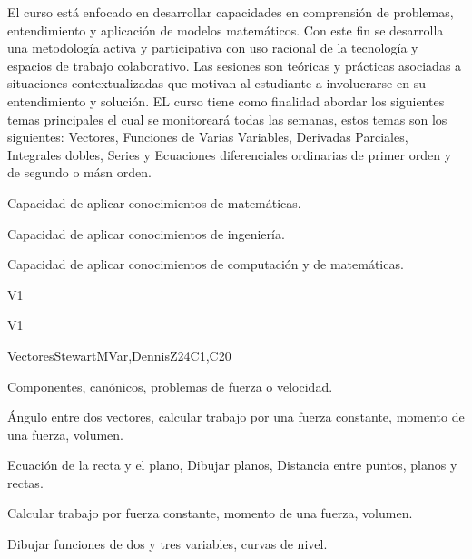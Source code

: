 \begin{syllabus}


\begin{justification}
  El curso está enfocado en desarrollar capacidades en comprensión de problemas, entendimiento y aplicación de modelos matemáticos. Con este fin se desarrolla una metodología activa y participativa con uso racional de la tecnología y espacios de trabajo colaborativo. Las sesiones son teóricas y prácticas asociadas a situaciones contextualizadas que motivan al estudiante a involucrarse en su entendimiento y solución.
  EL curso tiene como finalidad abordar los siguientes temas principales el cual se monitoreará todas las semanas, estos temas son los siguientes: Vectores, Funciones de Varias Variables, Derivadas Parciales, Integrales dobles, Series y Ecuaciones diferenciales ordinarias de primer orden y de segundo o másn orden.
\end{justification}

\begin{goals}
  \item Capacidad de aplicar conocimientos de matemáticas.
  \item Capacidad de aplicar conocimientos de ingeniería.
  \item Capacidad de aplicar conocimientos de computación y de matemáticas.
\end{goals}

\begin{outcomes}{V1}
    \item {}  
    \item {}
\end{outcomes}

\begin{competences}{V1}
    \item {}
    \item {}
\end{competences}

\begin{unit}{Vectores}{}{StewartMVar,DennisZ}{24}{C1,C20}
  \begin{topics}      
  \item Componentes, canónicos, problemas de fuerza o velocidad.
  \item Ángulo entre dos vectores, calcular trabajo por una fuerza constante, momento de una fuerza, volumen.
  \item Ecuación de la recta y el plano, Dibujar planos, Distancia entre puntos, planos y rectas.
  \item Calcular trabajo por fuerza constante, momento de una fuerza, volumen.
  \item Dibujar funciones de dos y tres variables, curvas de nivel.
    \end{topics}


\end{unit}
\end{syllabus}
